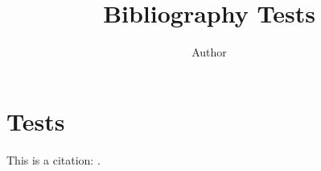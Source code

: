 \documentclass{article}
\title{Bibliography Tests}
\author{Author}
\begin{document}
\maketitle

\section{Tests}

This is a citation: \cite{Julia-2017}.

\printbibliography
\end{document}
